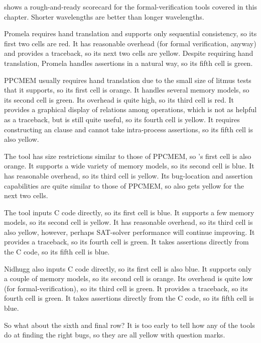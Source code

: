 shows a rough-and-ready scorecard for the formal-verification tools
covered in this chapter.
Shorter wavelengths are better than longer wavelengths.

Promela requires hand translation and supports only sequential
consistency, so its first two cells are red.
It has reasonable overhead (for formal verification, anyway)
and provides a traceback, so its next two cells are yellow.
Despite requiring hand translation, Promela handles assertions
in a natural way, so its fifth cell is green.

PPCMEM usually requires hand translation due to the small size of litmus
tests that it supports, so its first cell is orange.
It handles several memory models, so its second cell is green.
Its overhead is quite high, so its third cell is red.
It provides a graphical display of relations among operations, which
is not as helpful as a traceback, but is still quite useful, so its
fourth cell is yellow.
It requires constructing an  clause and cannot take
intra-process assertions, so its fifth cell is also yellow.

The  tool has size restrictions similar to those of PPCMEM,
so 's first cell is also orange.
It supports a wide variety of memory models, so its second cell is blue.
It has reasonable overhead, so its third cell is yellow.
Its bug-location and assertion capabilities are quite similar to those
of PPCMEM, so  also gets yellow for the next two cells.

The  tool inputs C code directly, so its first cell is blue.
It supports a few memory models, so its second cell is yellow.
It has reasonable overhead, so its third cell is also yellow, however,
perhaps SAT-solver performance will continue improving.
It provides a traceback, so its fourth cell is green.
It takes assertions directly from the C code, so its fifth cell is blue.

Nidhugg also inputs C code directly, so its first cell is also blue.
It supports only a couple of memory models, so its second cell is orange.
Its overhead is quite low (for formal-verification), so its
third cell is green.
It provides a traceback, so its fourth cell is green.
It takes assertions directly from the C code, so its fifth cell is blue.

So what about the sixth and final row?
It is too early to tell how any of the tools do at finding the right bugs,
so they are all yellow with question marks.

